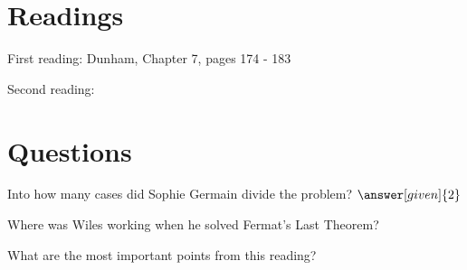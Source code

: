 \documentclass[nooutcomes]{ximera}
\begin{document}
\section{Readings}
First reading: Dunham, Chapter 7, pages 174 - 183

Second reading: 



\section{Questions}

\begin{question}
Into how many cases did Sophie Germain divide the problem? $\answer[given]{2}$
\end{question}

\begin{question}
Where was Wiles working when he solved Fermat's Last Theorem?
\begin{multipleChoice}
\end{multipleChoice}
\end{question}


\begin{question}
What are the most important points from this reading?
\begin{freeResponse}
\end{freeResponse}

\end{question}
\end{document}
